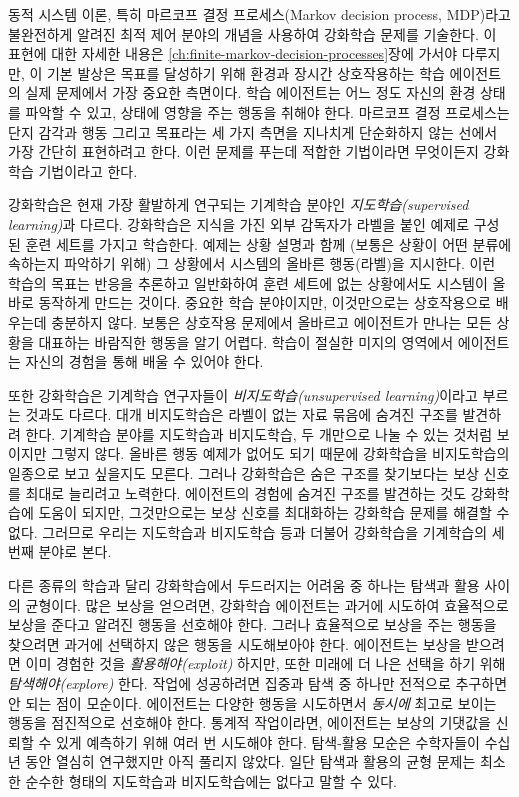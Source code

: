동적 시스템 이론, 특히 마르코프 결정 프로세스(Markov decision process, MDP)라고
불완전하게 알려진 최적 제어 분야의 개념을 사용하여 강화학습 문제를 기술한다. 이
표현에 대한 자세한 내용은 \ref{ch:finite-markov-decision-processes}장에 가서야
다루지만, 이
기본 발상은 목표를 달성하기 위해 환경과 장시간 상호작용하는 학습 에이전트의 실제
문제에서 가장 중요한 측면이다. 학습 에이전트는 어느 정도 자신의 환경 상태를
파악할 수 있고, 상태에 영향을 주는 행동을 취해야 한다. 마르코프 결정 프로세스는
단지 감각과
행동 그리고 목표라는 세 가지 측면을 지나치게 단순화하지 않는 선에서 가장 간단히
표현하려고 한다. 이런 문제를 푸는데 적합한 기법이라면 무엇이든지 강화학습
기법이라고 한다.


강화학습은 현재 가장 활발하게 연구되는 기계학습 분야인
\emph{지도학습(supervised learning)}과 다르다. 강화학습은 지식을 가진 외부
감독자가 라벨을 붙인 예제로 구성된 훈련 세트를 가지고 학습한다. 예제는 상황
설명과 함께 (보통은 상황이 어떤 분류에 속하는지 파악하기 위해) 그 상황에서
시스템의 올바른 행동(라벨)을 지시한다. 이런 학습의 목표는 반응을 추론하고
일반화하여 훈련 세트에 없는 상황에서도 시스템이 올바로 동작하게 만드는 것이다.
중요한 학습 분야이지만, 이것만으로는 상호작용으로 배우는데 충분하지 않다. 보통은
상호작용 문제에서 올바르고 에이전트가 만나는 모든 상황을 대표하는 바람직한
행동을 알기 어렵다. 학습이 절실한 미지의 영역에서 에이전트는 자신의 경험을 통해
배울 수 있어야 한다.

또한 강화학습은 기계학습 연구자들이 \emph{비지도학습(unsupervised
learning)}이라고 부르는 것과도 다르다. 대개
비지도학습은 라벨이 없는 자료 묶음에 숨겨진 구조를 발견하려 한다. 기계학습
분야를 지도학습과 비지도학습, 두 개만으로 나눌 수 있는 것처럼 보이지만 그렇지
않다. 올바른 행동 예제가 없어도 되기 때문에 강화학습을 비지도학습의 일종으로
보고 싶을지도 모른다. 그러나 강화학습은 숨은 구조를 찾기보다는 보상 신호를
최대로 늘리려고 노력한다. 에이전트의 경험에 숨겨진 구조를 발견하는 것도
강화학습에 도움이 되지만, 그것만으로는 보상 신호를 최대화하는 강화학습
문제를 해결할 수 없다. 그러므로 우리는 지도학습과 비지도학습 등과 더불어
강화학습을 기계학습의 세 번째 분야로 본다.

다른 종류의 학습과 달리 강화학습에서 두드러지는 어려움 중 하나는 탐색과 활용
사이의 균형이다. 많은 보상을 얻으려면, 강화학습 에이전트는 과거에 시도하여
효율적으로 보상을 준다고 알려진 행동을 선호해야 한다. 그러나 효율적으로 보상을
주는 행동을 찾으려면 과거에 선택하지 않은 행동을 시도해보아야 한다. 에이전트는
보상을 받으려면 이미 경험한 것을 \emph{활용해야(exploit)} 하지만, 또한 미래에
더 나은 선택을 하기 위해 \emph{탐색해야(explore)} 한다. 작업에 성공하려면 집중과
탐색 중 하나만 전적으로 추구하면 안 되는 점이 모순이다. 에이전트는 다양한 행동을
시도하면서 \emph{동시에} 최고로 보이는 행동을 점진적으로 선호해야 한다. 통계적
작업이라면, 에이전트는 보상의 기댓값을 신뢰할 수 있게 예측하기 위해 여러 번
시도해야 한다. 탐색-활용 모순은 수학자들이 수십 년 동안 열심히
연구했지만 아직 풀리지 않았다. 일단 탐색과 활용의 균형 문제는
최소한 순수한 형태의 지도학습과 비지도학습에는 없다고 말할 수 있다.

